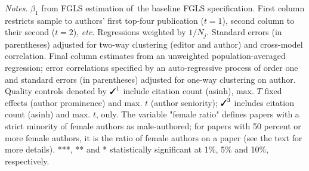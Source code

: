 \begin{table}
\begin{threeparttable}
\begin{tablenotes}
            \item \textit{Notes}. \(\beta_1\) from FGLS estimation of~the baseline FGLS specification. First column restricts sample to authors' first top-four publication (\(t=1\)), second column to their second (\(t=2\)), \textit{etc.} Regressions weighted by \(1/N_j\). Standard errors (in parentheses) adjusted for two-way clustering (editor and author) and cross-model correlation. Final column estimates from an unweighted population-averaged regression; error correlations specified by an auto-regressive process of order one and standard errors (in parentheses) adjusted for one-way clustering on author. Quality controls denoted by \(\text{\ding{51}}^1\) include citation count (asinh), \(\text{max. }T\) fixed effects (author prominence) and \(\text{max. }t\) (author seniority); \(\text{\ding{51}}^3\) includes citation count (asinh) and \(\text{max. }t\), only. The variable "female ratio" defines papers with a strict minority of female authors as male-authored; for papers with 50 percent or more female authors, it is the ratio of female authors on a paper (see the text for more details). ***, ** and * statistically significant at 1\%, 5\% and 10\%, respectively.
        \end{tablenotes}
    \end{threeparttable}
\end{table}